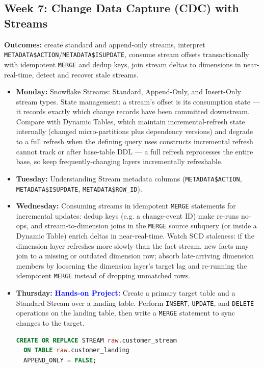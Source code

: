 \documentclass[11pt, a4paper]{article}
\newcommand{\project}[1]{\textbf{\textcolor{blue}{Hands-on Project:}} #1}
\newcommand{\dayitem}[2]{\item \textbf{#1:} #2}
\begin{document}
\subsection*{Week 7: Change Data Capture (CDC) with Streams}
\par\noindent\textbf{Outcomes:} create standard and append-only streams, interpret \texttt{METADATA\$ACTION}/\texttt{METADATA\$ISUPDATE}, consume stream offsets transactionally with idempotent \texttt{MERGE} and dedup keys, join stream deltas to dimensions in near-real-time, detect and recover stale streams.
\begin{itemize}[label=-]
    \dayitem{Monday}{Snowflake Streams: Standard, Append-Only, and Insert-Only stream types. State management: a stream's offset is its consumption state --- it records exactly which change records have been committed downstream. Compare with Dynamic Tables, which maintain incremental-refresh state internally (changed micro-partitions plus dependency versions) and degrade to a full refresh when the defining query uses constructs incremental refresh cannot track or after base-table DDL --- a full refresh reprocesses the entire base, so keep frequently-changing layers incrementally refreshable.}
    \dayitem{Tuesday}{Understanding Stream metadata columns (\texttt{METADATA\$ACTION}, \texttt{METADATA\$ISUPDATE}, \texttt{METADATA\$ROW\_ID}).}
    \dayitem{Wednesday}{Consuming streams in idempotent \texttt{MERGE} statements for incremental updates: dedup keys (e.g. a change-event ID) make re-runs no-ops, and stream-to-dimension joins in the \texttt{MERGE} source subquery (or inside a Dynamic Table) enrich deltas in near-real-time. Watch SCD staleness: if the dimension layer refreshes more slowly than the fact stream, new facts may join to a missing or outdated dimension row; absorb late-arriving dimension members by loosening the dimension layer's target lag and re-running the idempotent \texttt{MERGE} instead of dropping unmatched rows.}
    \dayitem{Thursday}{\project{Create a primary target table and a Standard Stream over a landing table. Perform \texttt{INSERT}, \texttt{UPDATE}, and \texttt{DELETE} operations on the landing table, then write a \texttt{MERGE} statement to sync changes to the target.}}
\begin{lstlisting}[language=SQL, caption={Stream + MERGE CDC pattern}]
CREATE OR REPLACE STREAM raw.customer_stream
  ON TABLE raw.customer_landing
  APPEND_ONLY = FALSE;


\end{lstlisting}
\end{itemize}
\end{document}
